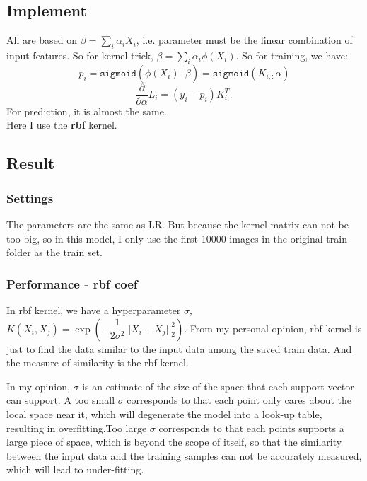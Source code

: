 \documentclass{article}
\begin{document}
\subsection{Implement}
All are based on $\beta=\sum_{i}\alpha_i X_i$, i.e. parameter must be the linear combination of input features. So for kernel trick, $\beta=\sum_{i}\alpha_i\phi(X_i)$. So for training, we have:
\begin{equation}
    p_i = \mathtt{sigmoid}(\phi(X_i)^\top\beta)=\mathtt{sigmoid}(K_{i,:} \alpha) 
\end{equation}
\begin{equation}
    \dfrac{\partial}{\partial \alpha}L_i = (y_i-p_i)K_{i,:}^T
\end{equation}
For prediction, it is almost the same. \\
Here I use the \textbf{rbf} kernel.
\subsection{Result}
\subsubsection{Settings}
The parameters are the same as LR. But because the kernel matrix can not be too big, so in this model, I only use the first 10000 images in the original train folder as the train set.
\subsubsection{Performance - rbf coef}
In rbf kernel, we have a hyperparameter $\sigma$, $K(X_i, X_j)=\exp\left(-\dfrac{1}{2\sigma^2}||X_i-X_j||_2^2\right)$. From my personal opinion, 
rbf kernel is just to find the data similar to the input data among the saved train data. And the measure of similarity is the rbf kernel.

In my opinion, $\sigma$ is an estimate of the size of the space that each support vector can support. A too small $\sigma$ corresponds to that each point only cares about the local space near it, which will degenerate the model into a 
look-up table, resulting in overfitting.Too large $\sigma$ corresponds to that each points supports a large piece of space, which is beyond the scope of itself, so that the similarity between the input data and the training samples can not be 
accurately measured, which will lead to under-fitting.
\end{document}
